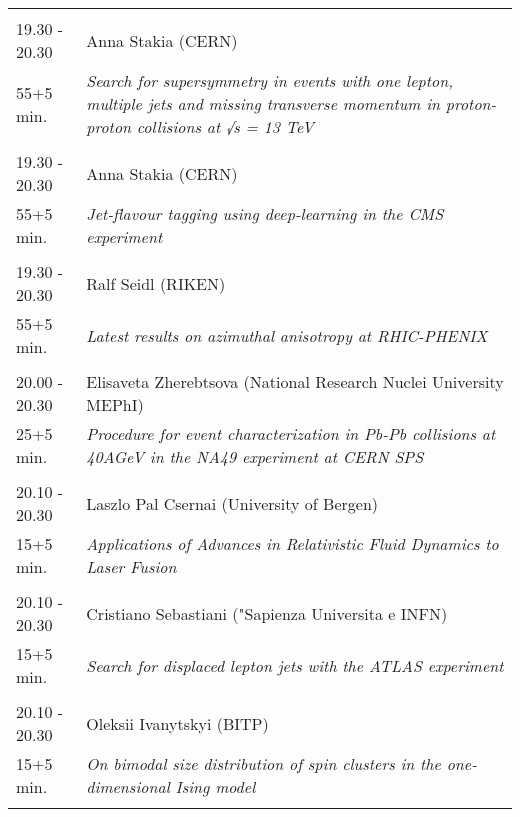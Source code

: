 \begin{longtable}{p{3cm}p{13cm}}
 & \\ 
19.30 - 20.30 & Anna Stakia (CERN)\\ 
55+5 min. & {\it Search for supersymmetry in events with one lepton, multiple jets and missing transverse momentum in proton-proton collisions at √s = 13 TeV}\\ 
 & \\ 
19.30 - 20.30 & Anna Stakia (CERN)\\ 
55+5 min. & {\it Jet-flavour tagging using deep-learning in the CMS experiment}\\ 
 & \\ 
19.30 - 20.30 & Ralf Seidl (RIKEN)\\ 
55+5 min. & {\it Latest results on azimuthal anisotropy at RHIC-PHENIX}\\ 
 & \\ 
20.00 - 20.30 & Elisaveta Zherebtsova (National Research Nuclei University MEPhI)\\ 
25+5 min. & {\it Procedure for event characterization in Pb-Pb collisions at 40AGeV in the NA49 experiment at CERN SPS}\\ 
 & \\ 
20.10 - 20.30 & Laszlo Pal Csernai (University of Bergen)\\ 
15+5 min. & {\it Applications of Advances in Relativistic Fluid Dynamics to Laser Fusion}\\ 
 & \\ 
20.10 - 20.30 & Cristiano Sebastiani ("Sapienza Universita e INFN)\\ 
15+5 min. & {\it Search for displaced lepton jets with the ATLAS experiment}\\ 
 & \\ 
20.10 - 20.30 & Oleksii Ivanytskyi (BITP)\\ 
15+5 min. & {\it On bimodal size distribution of spin clusters in the one-dimensional Ising model}\\ 
 & \\ 
\end{longtable}

